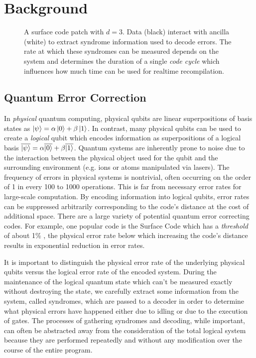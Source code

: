 \section{Background}
\begin{figure}
    \centering
    
    \caption{A surface code patch with $d = 3$. Data (black) interact with ancilla (white) to extract syndrome information used to decode errors. The rate at which these syndromes can be measured depends on the system and determines the duration of a single \textit{code cycle} which influences how much time can be used for realtime recompilation.}
    \label{fig:surface_code}
\end{figure}
\subsection{Quantum Error Correction}
In \textit{physical} quantum computing, physical qubits are linear superpositions of basis states as $\ket{\psi} = \alpha\ket{0} + \beta\ket{1}$. In contrast, many physical qubits can be used to create a \textit{logical} qubit which encodes information as superpositions of a logical basis $\overline{\ket{\psi}} = \alpha\overline{\ket{0}} + \beta\overline{\ket{1}}$. Quantum systems are inherently prone to noise due to the interaction between the physical object used for the qubit and the surrounding environment (e.g. ions or atoms manipulated via lasers). The frequency of errors in physical systems is nontrivial, often occurring on the order of 1 in every 100 to 1000 operations. This is far from necessary error rates for large-scale computation. By encoding information into logical qubits, error rates can be suppressed arbitrarily corresponding to the code's distance at the cost of additional space. There are a large variety of potential quantum error correcting codes. For example, one popular code is the Surface Code which has a \textit{threshold} of about 1\% \cite{fowler2018low}, the physical error rate below which increasing the code's distance results in exponential reduction in error rates. 

It is important to distinguish the physical error rate of the underlying physical qubits versus the logical error rate of the encoded system. During the maintenance of the logical quantum state which can't be measured exactly without destroying the state, we carefully extract some information from the system, called syndromes, which are passed to a decoder in order to determine what physical errors have happened either due to idling or due to the execution of gates. The processes of gathering syndromes and decoding, while important, can often be abstracted away from the consideration of the total logical system because they are performed repeatedly and without any modification over the course of the entire program.

